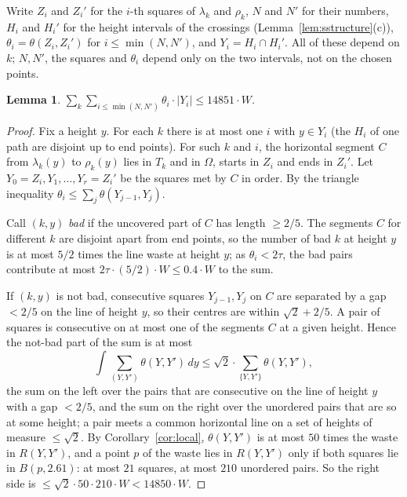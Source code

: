 \documentclass[11pt,letterpaper]{amsart}
\theoremstyle{plain}
\newtheorem{lemma}[theorem]{Lemma}
\theoremstyle{definition}
\theoremstyle{remark}
\begin{document}
Write $Z_i$ and $Z_i'$ for the $i$-th squares of $\lambda_k$ and $\rho_k$, $N$ and $N'$ for their numbers, $H_i$ and $H_i'$ for the height intervals of the crossings (Lemma~\ref{lem:sstructure}(c)), $\theta_i=\theta(Z_i,Z_i')$ for $i\le\min(N,N')$, and $Y_i=H_i\cap H_i'$. All of these depend on $k$; $N,N'$, the squares and $\theta_i$ depend only on the two intervals, not on the chosen points.

\begin{lemma}\label{lem:sideways}
$\sum_k\sum_{i\le\min(N,N')}\theta_i\cdot|Y_i|\le14851\cdot W$.
\end{lemma}
\begin{proof}
Fix a height $y$. For each $k$ there is at most one $i$ with $y\in Y_i$ (the $H_i$ of one path are disjoint up to end points). For such $k$ and $i$, the horizontal segment $C$ from $\lambda_k(y)$ to $\rho_k(y)$ lies in $T_k$ and in $\Omega$, starts in $Z_i$ and ends in $Z_i'$. Let $Y_0=Z_i,Y_1,\ldots,Y_r=Z_i'$ be the squares met by $C$ in order. By the triangle inequality $\theta_i\le\sum_j\theta(Y_{j-1},Y_j)$.

Call $(k,y)$ \emph{bad} if the uncovered part of $C$ has length $\ge2/5$. The segments $C$ for different $k$ are disjoint apart from end points, so the number of bad $k$ at height $y$ is at most $5/2$ times the line waste at height $y$; as $\theta_i<2\tau$, the bad pairs contribute at most $2\tau\cdot(5/2)\cdot W\le0.4\cdot W$ to the sum.

If $(k,y)$ is not bad, consecutive squares $Y_{j-1},Y_j$ on $C$ are separated by a gap $<2/5$ on the line of height $y$, so their centres are within $\sqrt2+2/5$. A pair of squares is consecutive on at most one of the segments $C$ at a given height. Hence the not-bad part of the sum is at most
\[
\int\sum_{(Y,Y')}\theta(Y,Y')\,dy\le\sqrt2\cdot\sum_{\{Y,Y'\}}\theta(Y,Y'),
\]
the sum on the left over the pairs that are consecutive on the line of height $y$ with a gap $<2/5$, and the sum on the right over the unordered pairs that are so at some height; a pair meets a common horizontal line on a set of heights of measure $\le\sqrt2$. By Corollary~\ref{cor:local}, $\theta(Y,Y')$ is at most $50$ times the waste in $R(Y,Y')$, and a point $p$ of the waste lies in $R(Y,Y')$ only if both squares lie in $B(p,2.61)$: at most $21$ squares, at most $210$ unordered pairs. So the right side is $\le\sqrt2\cdot50\cdot210\cdot W<14850\cdot W$.
\end{proof}
\end{document}
